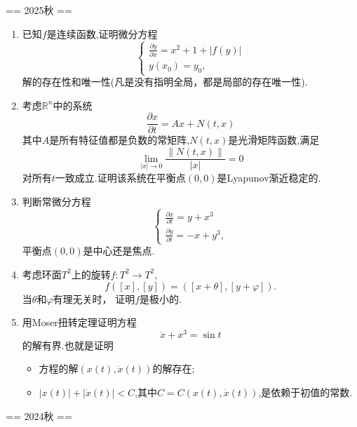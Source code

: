 
== 2025秋 ==
\begin{enumerate}
    \item[一、] 已知$f$是连续函数,证明微分方程
          \[\begin{cases}
              \frac{\partial y}{\partial x}=x^2+1+|f(y)| \\
              y(x_0) = y_0,
          \end{cases}\]
          解的存在性和唯一性(凡是没有指明全局，都是局部的存在唯一性).

    \item[二、]考虑$\mathbb{R}^n$中的系统
    $$\frac{\partial x}{\partial t}=Ax+N(t,x)$$
    其中$A$是所有特征值都是负数的常矩阵,$N(t,x)$是光滑矩阵函数,满足
    $$\lim\limits_{|x|\rightarrow 0}\frac{\|N(t,x)\|}{|x|}=0$$
    对所有$t$一致成立.证明该系统在平衡点$(0,0)$是Lyapunov渐近稳定的.

    \item[三、] 判断常微分方程
          \[\begin{cases}
              \frac{\partial x}{\partial t}=y+x^3 \\
              \frac{\partial y}{\partial t}=-x+y^3,
          \end{cases}\]
          平衡点$(0,0)$是中心还是焦点.
    
    \item[四、]考虑环面$T^2$上的旋转$f:T^2\rightarrow T^2$,
        $$f([x],[y])=([x+\theta],[y+\varphi]).$$当$\theta$和$\varphi$有理无关时，
        证明$f$是极小的.

    \item[五、]用Moser扭转定理证明方程
    $$\ddot{x}+x^3=\sin t$$的解有界.也就是证明
    \begin{itemize}
        \item[(1)] 方程的解$(x(t),\dot{x}(t))$的解存在;
        \item[(2)] $|x(t)|+|\dot{x}(t)|<C$,其中$C=C(x(t),\dot{x}(t))$,是依赖于初值的常数.
    \end{itemize}
\end{enumerate}

== 2024秋 ==

